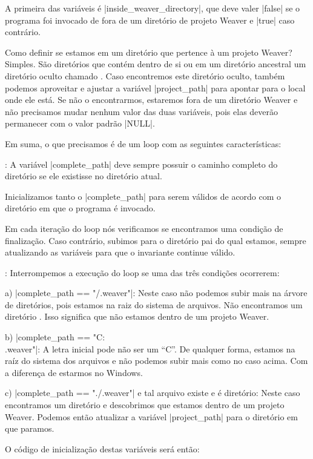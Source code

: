 {A primeira das variáveis é |inside_weaver_directory|, que deve valer
|false| se o programa foi invocado de fora de um diretório de projeto
Weaver e |true| caso contrário.

Como definir se estamos em um diretório que pertence à um projeto
Weaver? Simples. São diretórios que contém dentro de si ou em um
diretório ancestral um diretório oculto
chamado . Caso encontremos este diretório oculto,
também podemos aproveitar e ajustar a variável |project_path| para
apontar para o local onde ele está. Se não o encontrarmos, estaremos
fora de um diretório Weaver e não precisamos mudar nenhum valor das
duas variáveis, pois elas deverão permanecer com o valor padrão
|NULL|.

Em suma, o que precisamos é de um loop com as seguintes
características:

: A variável |complete_path| deve sempre
  possuir o caminho completo do diretório  se ele
  existisse no diretório atual.

 Inicializamos tanto o |complete_path|
  para serem válidos de acordo com o diretório em que o programa é
  invocado.

 Em cada iteração do loop nós verificamos se
  encontramos uma condição de finalização. Caso contrário, subimos
  para o diretório pai do qual estamos, sempre atualizando as
  variáveis para que o invariante continue válido.

: Interrompemos a execução do loop se uma das
  três condições ocorrerem:

a) |complete_path == "/.weaver"|: Neste caso não podemos subir mais na
árvore de diretórios, pois estamos na raiz do sistema de arquivos. Não
encontramos um diretório . Isso significa que não
estamos dentro de um projeto Weaver.

b) |complete_path == "C:\\.weaver"|: A letra inicial pode não ser um
``C''. De qualquer forma, estamos na raíz do sistema dos arquivos e
não podemos subir mais como no caso acima. Com a diferença de estarmos
no Windows.

c) |complete_path == "./.weaver"| e tal arquivo existe e é diretório:
Neste caso encontramos um diretório  e descobrimos
que estamos dentro de um projeto Weaver. Podemos então atualizar a
variável |project_path| para o diretório em que paramos.

O código de inicialização destas variáveis será então:

}
